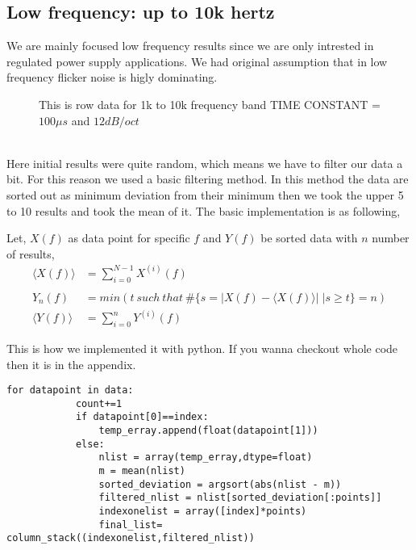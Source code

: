 \documentclass[12pt]{article}
\begin{document}
\subsection{Low frequency: up to 10k hertz}

We are mainly focused low frequency results since we are only intrested in regulated power supply applications. We had original assumption that in low frequency flicker noise is higly dominating.

\begin{figure}[hbt!]
\caption{This is row data for 1k to 10k frequency band TIME CONSTANT = $100\mu s$ and $12dB/oct$}
\end{figure}\\

Here initial results were quite random, which means we have to filter our data a bit. For this reason we used a basic filtering method. In this method the data are sorted out as minimum deviation from their minimum then we took the upper 5 to 10 results and took the mean of it. The basic implementation is as following,

Let, $X(f)$ as data point for specific $f$ and $Y(f)$ be sorted data with $n$ number of results,
\begin{align*}
\langle X(f) \rangle & = \sum_{i=0}^{N-1} X^{(i)}(f)\\
\\
Y_n(f) & = min(t\: such\: that\: \# \{ s = \lvert X(f)- \langle X(f)\rangle \rvert \; | s \geq t \} =n)\\
\langle Y(f) \rangle & = \sum_{i=0}^{n} Y^{(i)}(f)
\end{align*}

This is how we implemented it with python. If you wanna checkout whole code then it is in the appendix.

\begin{verbatim}
for datapoint in data:
            count+=1
            if datapoint[0]==index:
                temp_erray.append(float(datapoint[1]))
            else:
                nlist = array(temp_erray,dtype=float)
                m = mean(nlist)
                sorted_deviation = argsort(abs(nlist - m))
                filtered_nlist = nlist[sorted_deviation[:points]]
                indexonelist = array([index]*points)
                final_list= column_stack((indexonelist,filtered_nlist))

\end{verbatim}
\end{document}
